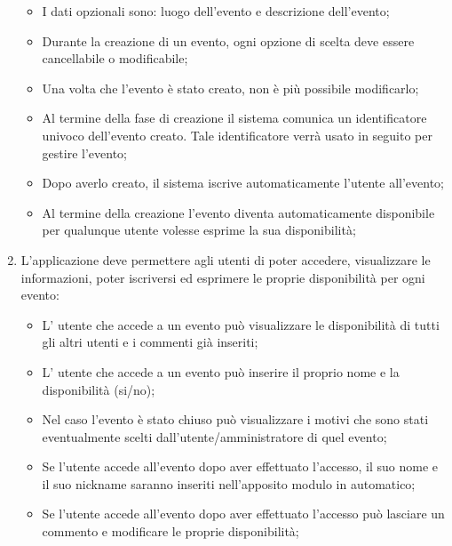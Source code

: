 \begin{enumerate}
\begin{itemize}
\item I dati opzionali sono: luogo dell'evento e descrizione dell'evento;
\item Durante la creazione di un evento, ogni opzione di scelta deve essere cancellabile o modificabile;
\item Una volta che l'evento è stato creato, non è più possibile modificarlo;
\item Al termine della fase di creazione il sistema comunica un identificatore univoco dell'evento creato. Tale identificatore verrà usato in seguito per gestire l'evento;
\item Dopo averlo creato, il sistema iscrive automaticamente l'utente all'evento;
\item Al termine della creazione l'evento diventa automaticamente disponibile per qualunque utente volesse esprime la sua disponibilità;
\end{itemize}
\item L'applicazione deve permettere agli utenti di poter accedere, visualizzare le informazioni, poter iscriversi ed esprimere le proprie disponibilità per ogni evento:
\begin{itemize}
\item L' utente che accede a un evento può visualizzare le disponibilità di tutti gli altri utenti e i commenti già inseriti;
\item L' utente che accede a un evento può inserire il proprio nome e la disponibilità (si/no);
\item Nel caso l'evento è stato chiuso può visualizzare i motivi che sono stati eventualmente scelti dall'utente/amministratore di quel evento;
\item Se l'utente accede all'evento dopo aver effettuato l'accesso, il suo nome e il suo nickname saranno inseriti nell'apposito modulo in automatico;
\item Se l'utente accede all'evento dopo aver effettuato l'accesso può lasciare un commento e modificare le proprie disponibilità;
\end{itemize}

\end{enumerate}

